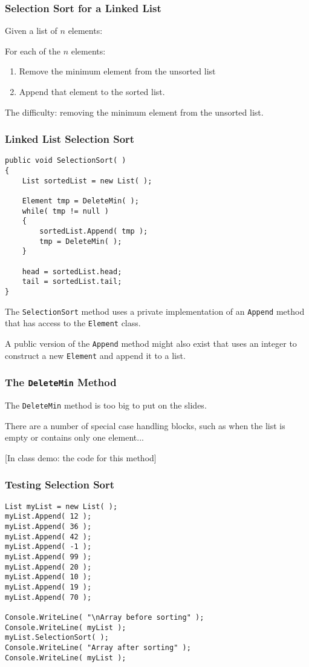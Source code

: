 \begin{frame}
\frametitle{Selection Sort for a Linked List}

Given a list of $n$ elements:

For each of the $n$ elements:
\begin{enumerate}
	\item Remove the minimum element from the unsorted list
	\item Append that element to the sorted list.
\end{enumerate}

The difficulty: removing the minimum element from the unsorted list.

\end{frame}

\begin{frame}[fragile]
\frametitle{Linked List Selection Sort}
{\scriptsize
\begin{verbatim}
public void SelectionSort( )
{
    List sortedList = new List( );

    Element tmp = DeleteMin( );
    while( tmp != null )	
    {
        sortedList.Append( tmp );
        tmp = DeleteMin( );
    }

    head = sortedList.head;
    tail = sortedList.tail;
}
\end{verbatim}
}

The \texttt{SelectionSort} method uses a private implementation of an \texttt{Append} method that has access to the \texttt{Element} class.  

A public version of the \texttt{Append} method might also exist that uses an integer to construct a new \texttt{Element} and append it to a list.

\end{frame}


\begin{frame}[fragile]
\frametitle{The \texttt{DeleteMin} Method}
The \texttt{DeleteMin} method is too big to put on the slides.

There are a number of special case handling blocks, such as when the list is empty or contains only one element...

[In class demo: the code for this method]

\end{frame}

\begin{frame}[fragile]
\frametitle{Testing Selection Sort}

\begin{verbatim}
List myList = new List( );
myList.Append( 12 );
myList.Append( 36 );
myList.Append( 42 );
myList.Append( -1 );
myList.Append( 99 );
myList.Append( 20 );
myList.Append( 10 );
myList.Append( 19 );
myList.Append( 70 );

Console.WriteLine( "\nArray before sorting" );
Console.WriteLine( myList );
myList.SelectionSort( );
Console.WriteLine( "Array after sorting" );
Console.WriteLine( myList );
\end{verbatim}

\end{frame}


